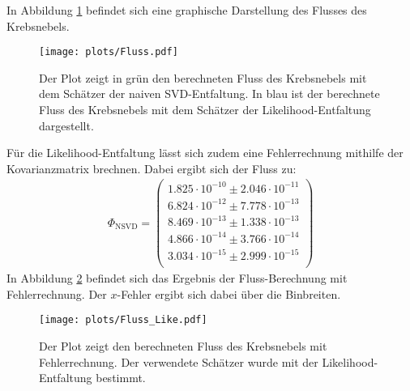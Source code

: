 In Abbildung \ref{fig:Fluss} befindet sich eine graphische Darstellung des Flusses des Krebsnebels.\\
\begin{figure}
  \centering
  \texttt{[image: plots/Fluss.pdf]}
  \caption{Der Plot zeigt in grün den berechneten Fluss des Krebsnebels mit dem Schätzer der naiven SVD-Entfaltung. In blau ist der berechnete Fluss des Krebsnebels mit dem Schätzer der Likelihood-Entfaltung dargestellt.}
  \label{fig:Fluss}
\end{figure}
Für die Likelihood-Entfaltung lässt sich zudem eine Fehlerrechnung mithilfe der Kovarianzmatrix brechnen. Dabei ergibt sich der Fluss zu:
\begin{align*}
	\Phi_{\text{NSVD}} = \begin{pmatrix}
			1.825\cdot10^{-10}\pm 2.046\cdot10^{-11}\\
			6.824\cdot10^{-12}\pm 7.778\cdot10^{-13}\\
			8.469\cdot10^{-13}\pm 1.338\cdot10^{-13}\\
			4.866\cdot10^{-14}\pm 3.766\cdot10^{-14}\\
			3.034\cdot10^{-15}\pm 2.999\cdot10^{-15}\\
	 \end{pmatrix}
\end{align*}
In Abbildung \ref{fig:FlussLike} befindet sich das Ergebnis der Fluss-Berechnung mit Fehlerrechnung. Der $x$-Fehler ergibt sich dabei über die Binbreiten.
\begin{figure}
  \centering
  \texttt{[image: plots/Fluss\_Like.pdf]}
  \caption{Der Plot zeigt den berechneten Fluss des Krebsnebels mit Fehlerrechnung. Der verwendete Schätzer wurde mit der Likelihood-Entfaltung bestimmt.}
  \label{fig:FlussLike}
\end{figure}
